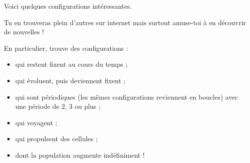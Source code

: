 \documentclass[11pt,class=report,crop=false]{standalone}
\begin{document}
Voici quelques configurations intéressantes. 

Tu en trouveras plein d'autres sur internet mais surtout amuse-toi à en découvrir de nouvelles !

En particulier, trouve des configurations :
\begin{itemize}
  \item qui restent fixent au cours du temps ;
  \item qui évoluent, puis deviennent fixent ;
  \item qui sont périodiques (les mêmes configurations reviennent en boucles) avec une période de $2$, $3$ ou plus ;
  \item qui voyagent ;
  \item qui propulsent des cellules ; 
  \item dont la population augmente indéfiniment !
\end{itemize}
\end{document}
